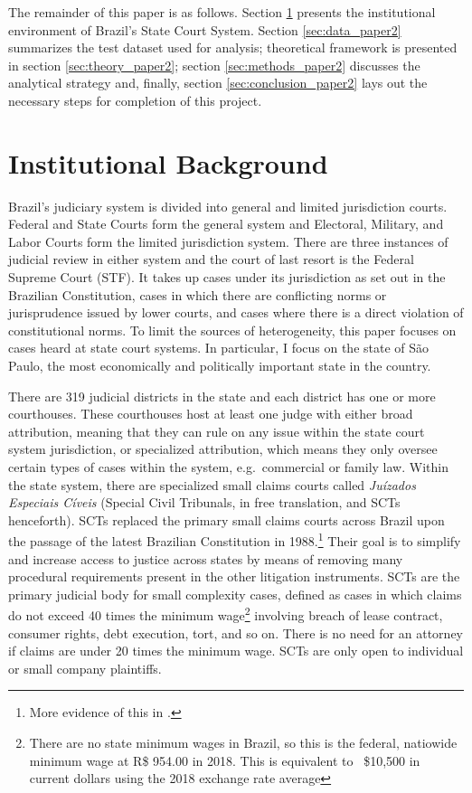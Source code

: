 \documentclass[11pt]{article}
\begin{document}
The remainder of this paper is as follows. Section \ref{sec:background_paper2} presents the institutional environment of Brazil's State Court System. Section \ref{sec:data_paper2} summarizes the test dataset used for analysis; theoretical framework is presented in section \ref{sec:theory_paper2}; section \ref{sec:methods_paper2} discusses the analytical strategy and, finally, section \ref{sec:conclusion_paper2} lays out the necessary steps for completion of this project.

\section{Institutional Background} \label{sec:background_paper2}

Brazil's judiciary system is divided into general and limited jurisdiction courts. Federal and State Courts form the general system and Electoral, Military, and Labor Courts form the limited jurisdiction system. There are three instances of judicial review in either system and the court of last resort is the Federal Supreme Court (STF). It takes up cases under its jurisdiction as set out in the Brazilian Constitution, cases in which there are conflicting norms or jurisprudence issued by lower courts, and cases where there is a direct violation of constitutional norms. To limit the sources of heterogeneity, this paper focuses on cases heard at state court systems. In particular, I focus on the state of São Paulo, the most economically and politically important state in the country.

There are 319 judicial districts in the state and each district has one or more courthouses. These courthouses host at least one judge with either broad attribution, meaning that they can rule on any issue within the state court system jurisdiction, or specialized attribution, which means they only oversee certain types of cases within the system, e.g.~commercial or family law. Within the state system, there are specialized small claims courts called \emph{Juízados Especiais Cíveis} (Special Civil Tribunals, in free translation, and SCTs henceforth). SCTs replaced the primary small claims courts across Brazil upon the passage of the latest Brazilian Constitution in 1988.\footnote{More evidence of this in \citet{LichandAccessJusticeEntrepreneurship2014}.} Their goal is to simplify and increase access to justice across states by means of removing many procedural requirements present in the other litigation instruments. SCTs are the primary judicial body for small complexity cases, defined as cases in which claims do not exceed 40 times the minimum wage\footnote{There are no state minimum wages in Brazil, so this is the federal, natiowide minimum wage at R\$ 954.00 in 2018. This is equivalent to ~\$10,500 in current dollars using the 2018 exchange rate average} involving breach of lease contract, consumer rights, debt execution, tort, and so on. There is no need for an attorney if claims are under 20 times the minimum wage. SCTs are only open to individual or small company plaintiffs.
\end{document}
